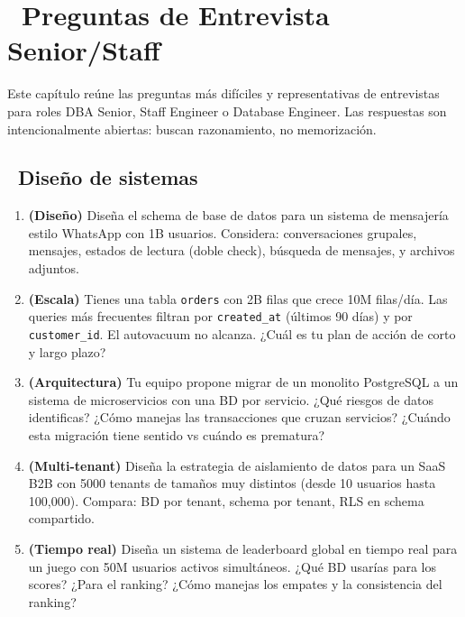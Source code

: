\chapter[Preguntas de Entrevista Senior/Staff]{~Preguntas de Entrevista Senior/Staff}

Este capítulo reúne las preguntas más difíciles y representativas de entrevistas para roles DBA Senior, Staff Engineer o Database Engineer.
Las respuestas son intencionalmente abiertas: buscan razonamiento, no memorización.

\section[Diseño de sistemas]{~Diseño de sistemas}

\begin{entrevistabox}
\begin{enumerate}
  \item \textbf{(Diseño)} Diseña el schema de base de datos para un sistema de mensajería estilo WhatsApp con 1B usuarios. Considera: conversaciones grupales, mensajes, estados de lectura (doble check), búsqueda de mensajes, y archivos adjuntos.

  \item \textbf{(Escala)} Tienes una tabla \texttt{orders} con 2B filas que crece 10M filas/día. Las queries más frecuentes filtran por \texttt{created\_at} (últimos 90 días) y por \texttt{customer\_id}. El autovacuum no alcanza. ¿Cuál es tu plan de acción de corto y largo plazo?

  \item \textbf{(Arquitectura)} Tu equipo propone migrar de un monolito PostgreSQL a un sistema de microservicios con una BD por servicio. ¿Qué riesgos de datos identificas? ¿Cómo manejas las transacciones que cruzan servicios? ¿Cuándo esta migración tiene sentido vs cuándo es prematura?

  \item \textbf{(Multi-tenant)} Diseña la estrategia de aislamiento de datos para un SaaS B2B con 5000 tenants de tamaños muy distintos (desde 10 usuarios hasta 100,000). Compara: BD por tenant, schema por tenant, RLS en schema compartido.

  \item \textbf{(Tiempo real)} Diseña un sistema de leaderboard global en tiempo real para un juego con 50M usuarios activos simultáneos. ¿Qué BD usarías para los scores? ¿Para el ranking? ¿Cómo manejas los empates y la consistencia del ranking?
\end{enumerate}
\end{entrevistabox}

